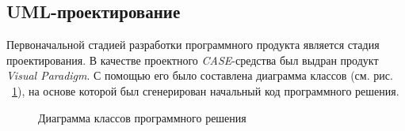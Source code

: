 \subsection{UML-проектирование}

Первоначальной стадией разработки программного продукта является стадия проектирования.
В качестве проектного {\it CASE}-средства был выдран продукт {\it Visual Paradigm}.
С помощью его было составлена диаграмма классов (см. рис. ~\ref{ris:UML}), на основе которой был сгенерирован начальный код программного решения.

\begin{figure}[h]
\caption{Диаграмма классов программного решения}
\label{ris:UML}
\end{figure}